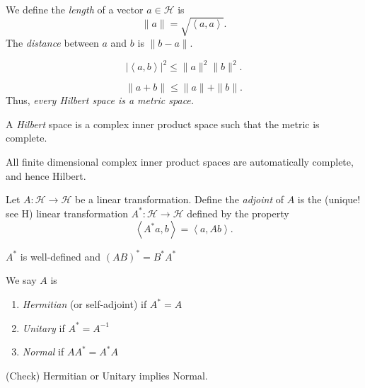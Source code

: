 We define the \textit{length }of a vector $a \in \mathscr{H}$ is
\[
	\|a\| = \sqrt{\left\langle a, a \right\rangle } 
.\] 
The \textit{distance} between $a$ and $b$ is $\|b - a\|$.

\begin{theorem}
	\label{lem:CauchySchwatzInequality}
	\[
		\left| \left\langle a, b \right\rangle  \right| ^2 \le 
		\|a\|^2 \|b\|^2
	.\] 
\end{theorem}

\begin{corollary}
	\[
		\|a + b\| \le  \|a\| + \|b\|
	.\] 
	Thus, \textit{every Hilbert space is a metric space.}
\end{corollary}

\begin{definition}
	\label{defn:HilbertSpace}
	
	A \textit{Hilbert} space is a complex inner product space such that the metric is complete.
\end{definition}

\begin{fact}
	All finite dimensional complex inner product spaces are automatically complete, and hence Hilbert.
\end{fact}

\begin{definition}[Adjoint]
	\label{defn:adjoint}
Let $A: \mathscr{H} \to \mathscr{H}$ be a linear transformation. Define the \textit{adjoint} of $A$ is the (unique! see H) linear transformation $A^*: \mathscr{H} \to  \mathscr{H}$ defined by the property
\[
	\left\langle A^* a, b \right\rangle  = \left\langle a, Ab \right\rangle 
.\] 
\end{definition}

\begin{lemma}
	$A^*$ is well-defined and $(AB)^* = B^* A^*$
\end{lemma}

\begin{definition}
	We say $A$ is 
	\begin{enumerate}
		\item \textit{Hermitian} (or self-adjoint) if $A^* = A$
		\item \textit{Unitary} if $A^*  = A^{-1}$
		\item \textit{Normal} if $A A^* = A^* A$
	\end{enumerate}
\end{definition}
(Check) Hermitian or Unitary implies Normal.

